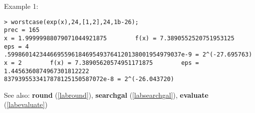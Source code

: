 \noindent Example 1: 
\begin{center}\begin{minipage}{15cm}\begin{Verbatim}[frame=single]
> worstcase(exp(x),24,[1,2],24,1b-26);
prec = 165
x = 1.99999988079071044921875        f(x) = 7.3890552520751953125        eps = 4
.5998601423446695596184695493764120138001954979037e-9 = 2^(-27.695763) 
x = 2        f(x) = 7.38905620574951171875        eps = 1.4456360874967301812222
8379395533417878125150587072e-8 = 2^(-26.043720) 

\end{Verbatim}
\end{minipage}\end{center}
See also: \textbf{round} (\ref{labround}), \textbf{searchgal} (\ref{labsearchgal}), \textbf{evaluate} (\ref{labevaluate})
